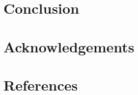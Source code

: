 \documentclass[runningheads]{llncs}
\begin{document}
\section{Conclusion}\label{sec:conclusion}

\section*{Acknowledgements}

\section*{References}
  
  
\end{document}
